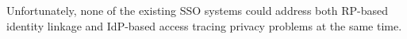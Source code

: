 



Unfortunately, %
none of the existing SSO systems could address both RP-based identity linkage and IdP-based access tracing privacy problems at the same time.
